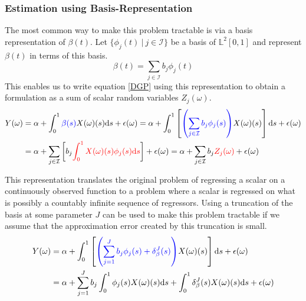 \documentclass[11pt,twoside,a4paper]{article}
\begin{document}
	\subsubsection{Estimation using Basis-Representation}\label{basis_exp_transf}
	The most common way to make this problem tractable is via a basis representation of $\beta(t)$. Let $\{\phi_j(t) \: \vert \: j \in \mathcal{I}\}$ be a basis of $\mathbb{L}^2[0,1]$ and represent $\beta(t)$ in terms of this basis.
	\begin{equation}
		\beta(t) = \sum_{j \in \mathcal{I}} b_j \phi_j(t)
	\end{equation}
	This enables us to write equation \ref{DGP} using this representation to obtain a formulation as a sum of scalar random variables $Z_j(\omega)$.	
	\begin{equation}
		\begin{split}
			Y(\omega) & = \alpha + \int_{0}^{1} {\color{blue}\beta(s)} X(\omega)(s)\mathrm{d}s + \epsilon(\omega)
			= \alpha + \int_{0}^{1}\left[{\color{blue}\left(\sum_{j \in \mathcal{I}} b_j \phi_j(s)\right)} X(\omega)(s) \right]\mathrm{d}s + \epsilon(\omega) \\
			& = \alpha + \sum_{j \in \mathcal{I}} \left[b_j \textcolor{red}{\int_{0}^{1} X(\omega)(s) \phi_j(s)\mathrm{d}s}\right] + \epsilon(\omega)
		      = \alpha + \sum_{j \in \mathcal{I}} b_j \textcolor{red}{Z_j(\omega)} + \epsilon(\omega)
		\end{split}
	\end{equation}
	
	This representation translates the original problem of regressing a scalar on a continuously observed function to a problem where a scalar is regressed on what is possibly a countably infinite sequence of regressors. Using a truncation of the basis at some parameter $J$ can be used to make this problem tractable if we assume that the approximation error created by this truncation is small.
	\begin{equation}
		\begin{split}
			Y(\omega) & = \alpha + \int_{0}^{1}\left[{\color{blue}\left(\sum_{j = 1}^{J} b_j \phi_j(s) + \delta_{\beta}^{J}(s)\right)} X(\omega)(s) \right]\mathrm{d}s + \epsilon(\omega) \\
			& = \alpha + \sum_{j = 1}^{J} b_j \int_{0}^{1} \phi_j(s) X(\omega)(s) \mathrm{d}s +  \int_{0}^{1} \delta_{\beta}^{J}(s) X(\omega)(s) \mathrm{d}s + \epsilon(\omega)
		\end{split}
	\end{equation}
\end{document}
